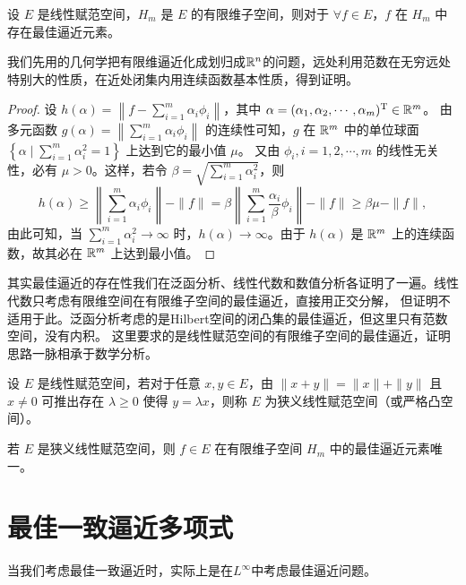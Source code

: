 \begin{theorem}[最佳逼近元素的存在性]
    设 \(E\) 是线性赋范空间，\(H_m\) 是 \(E\) 的有限维子空间，则对于
    \(\forall f \in E\)，\(f\) 在 \(H_m\) 中存在最佳逼近元素。
\end{theorem}

我们先用的几何学把有限维逼近化成划归成\(\mathbb{R}^{n} \)的问题，远处利用范数在无穷远处特别大的性质，在近处闭集内用连续函数基本性质，得到证明。

\begin{proof}
    设 \(h(\alpha) = \left\| f - \sum_{i=1}^m \alpha_i \phi_i
    \right\|\)，其中 \(\alpha = (\alpha_1, \alpha_2, \cdots,
    \alpha_m)^{\mathrm{T}} \in \mathbb{R}^m\)。
    由多元函数 \(g(\alpha) = \left\| \sum_{i=1}^m \alpha_i \phi_i
    \right\|\) 的连续性可知，\(g\) 在 \(\mathbb{R}^m\) 中的单位球面 \(\left\{
    \alpha \mid \sum_{i=1}^m \alpha_i^2 = 1 \right\}\) 上达到它的最小值 \(\mu\)。
    又由 \(\phi_i, i = 1, 2, \cdots, m\) 的线性无关性，必有 \(\mu > 0\)。这样，若令
    \(\beta = \sqrt{\sum_{i=1}^m \alpha_i^2}\)，则
    \[
        h(\alpha) \geqslant \left\| \sum_{i=1}^m \alpha_i \phi_i
        \right\| - \|f\| = \beta \left\| \sum_{i=1}^m
        \frac{\alpha_i}{\beta} \phi_i \right\| - \|f\| \geqslant
        \beta \mu - \|f\|,
    \]
    由此可知，当 \(\sum_{i=1}^m \alpha_i^2 \to \infty\) 时，\(h(\alpha) \to
    \infty\)。由于 \(h(\alpha)\) 是 \(\mathbb{R}^m\) 上的连续函数，故其必在
    \(\mathbb{R}^m\) 上达到最小值。
\end{proof}

其实最佳逼近的存在性我们在泛函分析、线性代数和数值分析各证明了一遍。线性代数只考虑有限维空间在有限维子空间的最佳逼近，直接用正交分解，
但证明不适用于此。泛函分析考虑的是Hilbert空间的闭凸集的最佳逼近，但这里只有范数空间，没有内积。
这里要求的是线性赋范空间的有限维子空间的最佳逼近，证明思路一脉相承于数学分析。

\begin{definition}
    设 \(E\) 是线性赋范空间，若对于任意 \(x, y \in E\)，由 \(\|x+y\| = \|x\| +
    \|y\|\) 且 \(x \neq 0\) 可推出存在 \(\lambda \ge 0\) 使得 \(y = \lambda
    x\)，则称 \(E\) 为狭义线性赋范空间（或严格凸空间）。
\end{definition}

\begin{theorem}
    若 \(E\) 是狭义线性赋范空间，则 \(f \in E\) 在有限维子空间 \(H_m\) 中的最佳逼近元素唯一。
\end{theorem}

\section{最佳一致逼近多项式}
当我们考虑最佳一致逼近时，实际上是在\(L^{\infty } \)中考虑最佳逼近问题。

